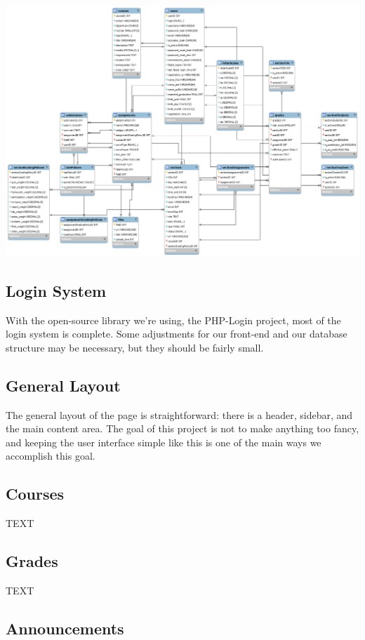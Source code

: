 \documentclass{article}
\begin{document}
\includegraphics[width=6.5 in]{db}

\subsection{Login System}

With the open-source library we're using, the PHP-Login project, most of the
login system is complete. Some adjustments for our front-end and our database
structure may be necessary, but they should be fairly small.

\subsection{General Layout}

The general layout of the page is straightforward: there is a header, sidebar,
and the main content area. The goal of this project is not to make anything too
fancy, and keeping the user interface simple like this is one of the main ways
we accomplish this goal.


\subsection{Courses}

TEXT

\subsection{Grades}

TEXT

\subsection{Announcements}
\end{document}
